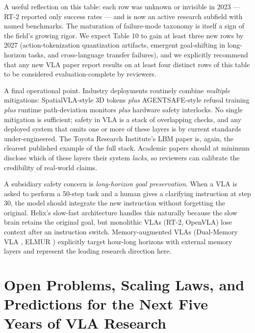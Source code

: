 \documentclass{article}
\begin{document}
A useful reflection on this table: each row was unknown or invisible in 2023 --- RT-2 reported only success rates --- and is now an active research subfield with named benchmarks. The maturation of failure-mode taxonomy is itself a sign of the field's growing rigor. We expect Table 10 to gain at least three new rows by 2027 (action-tokenization quantization artifacts, emergent goal-shifting in long-horizon tasks, and cross-language transfer failures), and we explicitly recommend that any new VLA paper report results on at least four distinct rows of this table to be considered evaluation-complete by reviewers.

A final operational point. Industry deployments routinely combine \emph{multiple} mitigations: SpatialVLA-style 3D tokens \emph{plus} AGENTSAFE-style refusal training \emph{plus} runtime path-deviation monitors \emph{plus} hardware safety interlocks. No single mitigation is sufficient; safety in VLA is a stack of overlapping checks, and any deployed system that omits one or more of these layers is by current standards under-engineered. The Toyota Research Institute's LBM paper \cite{barreiros2026acarefulexaminatio} is, again, the clearest published example of the full stack. Academic papers should at minimum disclose which of these layers their system \emph{lacks}, so reviewers can calibrate the credibility of real-world claims.

A subsidiary safety concern is \emph{long-horizon goal preservation}. When a VLA is asked to perform a 50-step task and a human gives a clarifying instruction at step 30, the model should integrate the new instruction without forgetting the original. Helix's slow-fast architecture handles this naturally because the slow brain retains the original goal, but monolithic VLAs (RT-2, OpenVLA) lose context after an instruction switch. Memory-augmented VLAs (Dual-Memory VLA \cite{li2026globalpriormeetslo}, ELMUR \cite{cherepanov2025elmurexternallayer}) explicitly target hour-long horizons with external memory layers and represent the leading research direction here.

\section{Open Problems, Scaling Laws, and Predictions for the Next Five Years of VLA Research}\label{open-problems-scaling-laws-and-predictions-for-the-next-five-years-of-vla-research}
\end{document}
